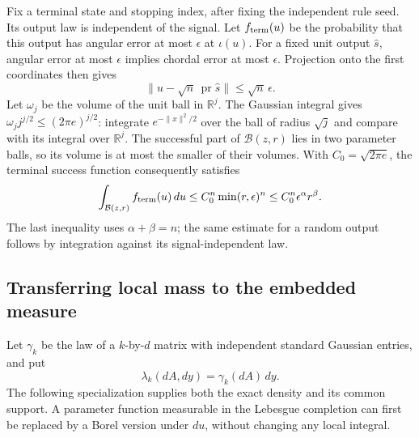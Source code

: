Fix a terminal state and stopping index, after fixing the independent
rule seed.  Its output law is independent of the signal.  Let
\(f_{\rm term}(u)\) be the probability that this output has angular
error at most \(\epsilon\) at \(\iota(u)\).  For a fixed unit output
\(\widehat s\), angular error at most \(\epsilon\) implies
chordal error at most \(\epsilon\).  Projection onto the first
coordinates then gives
\[
 \|u-\sqrt n\,\operatorname{pr}\widehat s\|
 \le\sqrt n\,\epsilon.
\]
Let \(\omega_j\) be the volume of the unit ball in \(\mathbb R^j\).
The Gaussian integral gives
\(\omega_j j^{j/2}\le(2\pi e)^{j/2}\): integrate
\(e^{-\|x\|^2/2}\) over the ball of radius \(\sqrt j\) and compare
with its integral over \(\mathbb R^j\).  The successful part of
\(\mathcal B(z,r)\) lies in two parameter balls, so its volume is at
most the smaller of their volumes.  With \(C_0=\sqrt{2\pi e}\), the
terminal success function consequently satisfies
\begin{equation}\label{h:cube:terminal}
 \int_{\mathcal B(z,r)}f_{\rm term}(u)\,du
 \le C_0^n\min(r,\epsilon)^n
 \le C_0^n\epsilon^\alpha r^\beta.
\end{equation}
The last inequality uses \(\alpha+\beta=n\); the same estimate for a
random output follows by integration against its signal-independent law.

\subsection{Transferring local mass to the embedded measure}

Let \(\gamma_k\) be the law of a \(k\)-by-\(d\) matrix with
independent standard Gaussian entries, and put
\[
 \lambda_k(dA,dy)=\gamma_k(dA)\,dy.
\]
The following specialization supplies both the exact density and its
common support.  A parameter function measurable in the Lebesgue
completion can first be replaced by a Borel version under \(du\),
without changing any local integral.


